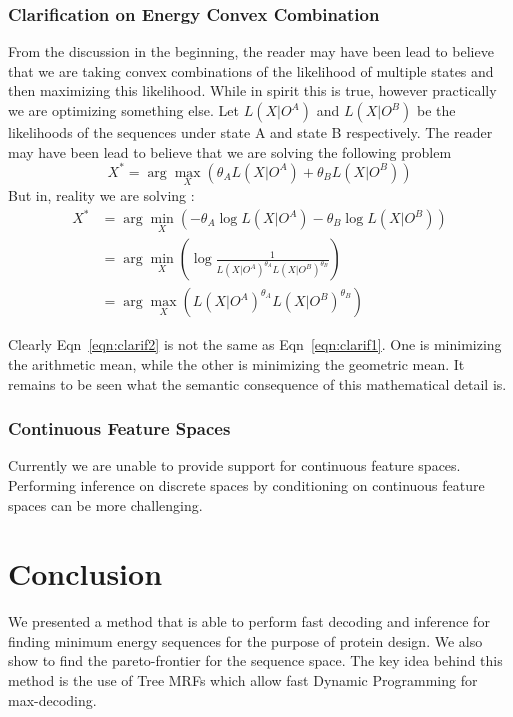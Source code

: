 \documentclass{article}
\begin{document}
\subsubsection{Clarification on Energy Convex Combination}
From the discussion in the beginning, the reader may have been lead to believe that we are taking convex combinations of the likelihood of multiple states and then maximizing this likelihood. While in spirit this is true, however practically we are optimizing something else. Let $L(X|O^A)$  and $L(X|O^B)$ be the likelihoods of the sequences under state A and state B respectively. The reader may have been lead to believe that we are solving the following problem
\begin{equation}
\label{eqn:clarif1}
X^* = \arg \max_X \left( \theta_A L(X|O^A) + \theta_B L(X|O^B) \right)
\end{equation}
But in, reality we are solving : 
\begin{align}
X^* &= \arg \min_X \left( -\theta_A \log L(X|O^A) - \theta_B \log L(X|O^B) \right) \\
&= \arg \min_X \left( \log \frac{1}{L(X|O^A)^{\theta_A} L(X|O^B)^{\theta_B}} \right) \\
&= \arg \max_X \left( L(X|O^A)^{\theta_A} L(X|O^B)^{\theta_B} \right)
\label{eqn:clarif2} 
\end{align}

Clearly Eqn~\ref{eqn:clarif2} is not the same as Eqn~\ref{eqn:clarif1}. One is minimizing the arithmetic mean, while the other is minimizing the geometric mean. It remains to be seen what the semantic consequence of this mathematical detail is. 


\subsubsection{Continuous Feature Spaces}
Currently we are unable to provide support for continuous feature spaces.  Performing inference on discrete spaces by conditioning on continuous feature spaces can be more challenging.


\section{Conclusion}
We presented a method that is able to perform fast decoding and inference for finding minimum energy sequences for the purpose of protein design. We also show to find the pareto-frontier for the sequence space. The key idea behind this method is the use of Tree MRFs which allow fast Dynamic Programming for max-decoding.
\end{document}

